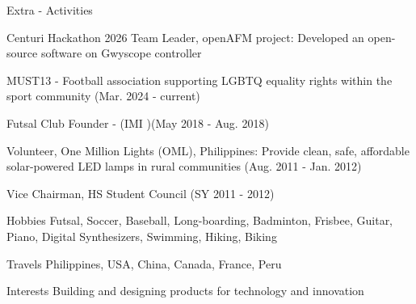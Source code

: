 
\begin{cvskills}

	\cvskill
	{Extra - Activities}
    {
    \begin{cvitems}
    \item Centuri Hackathon 2026 Team Leader, openAFM project: Developed an open-source software on Gwyscope controller
    \item MUST13 - Football association supporting LGBTQ equality rights within the sport community (Mar. 2024 - current)
    \item Futsal Club Founder - (IMI )(May 2018 - Aug. 2018)
    \item Volunteer, One Million Lights (OML), Philippines: Provide clean, safe, affordable solar-powered LED lamps in rural communities (Aug. 2011 - Jan. 2012)
    \item Vice Chairman, HS Student Council (SY 2011 - 2012)
    \end{cvitems}
    \vspace{1em}
    }

	\cvskill
	{Hobbies}
    {Futsal, Soccer, Baseball, Long-boarding, Badminton, Frisbee, Guitar, Piano, Digital Synthesizers, Swimming, Hiking, Biking}

	\cvskill
	{Travels}
    {Philippines, USA, China, Canada, France, Peru}

	\cvskill
	{Interests}
    {Building and designing products for technology and innovation}

\end{cvskills}
